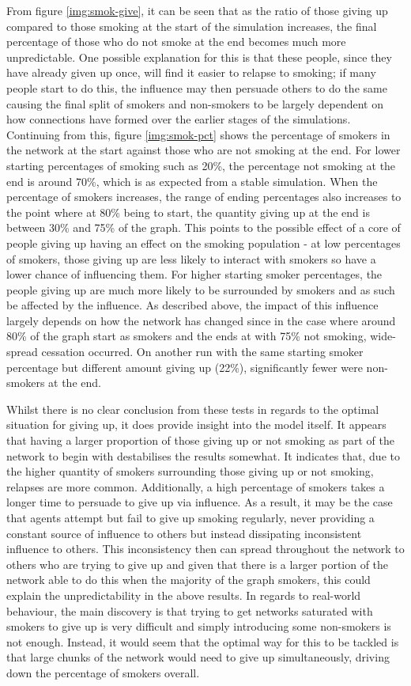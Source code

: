 \documentclass[]{report}
\begin{document}
From figure \ref{img:smok-give}, it can be seen that as the ratio of those giving up compared to those smoking at the start of the simulation increases, the final percentage of those who do not smoke at the end becomes much more unpredictable. One possible explanation for this is that these people, since they have already given up once, will find it easier to relapse to smoking; if many people start to do this, the influence may then persuade others to do the same causing the final split of smokers and non-smokers to be largely dependent on how connections have formed over the earlier stages of the simulations. Continuing from this, figure \ref{img:smok-pct} shows the percentage of smokers in the network at the start against those who are not smoking at the end. For lower starting percentages of smoking such as 20\%, the percentage not smoking at the end is around 70\%, which is as expected from a stable simulation. When the percentage of smokers increases, the range of ending percentages also increases to the point where at 80\% being to start, the quantity giving up at the end is between 30\% and 75\% of the graph. This points to the possible effect of a core of people giving up having an effect on the smoking population - at low percentages of smokers, those giving up are less likely to interact with smokers so have a lower chance of influencing them. For higher starting smoker percentages, the people giving up are much more likely to be surrounded by smokers and as such be affected by the influence. As described above, the impact of this influence largely depends on how the network has changed since in the case where around 80\% of the graph start as smokers and the ends at with 75\% not smoking, wide-spread cessation occurred. On another run with the same starting smoker percentage but different amount giving up (22\%), significantly fewer were non-smokers at the end.

Whilst there is no clear conclusion from these tests in regards to the optimal situation for giving up, it does provide insight into the model itself. It appears that having a larger proportion of those giving up or not smoking as part of the network to begin with destabilises the results somewhat. It indicates that, due to the higher quantity of smokers surrounding those giving up or not smoking, relapses are more common. Additionally, a high percentage of smokers takes a longer time to persuade to give up via influence. As a result, it may be the case that agents attempt but fail to give up smoking regularly, never providing a constant source of influence to others but instead dissipating inconsistent influence to others. This inconsistency then can spread throughout the network to others who are trying to give up and given that there is a larger portion of the network able to do this when the majority of the graph smokers, this could explain the unpredictability in the above results. In regards to real-world behaviour, the main discovery is that trying to get networks saturated with smokers to give up is very difficult and simply introducing some non-smokers is not enough. Instead, it would seem that the optimal way for this to be tackled is that large chunks of the network would need to give up simultaneously, driving down the percentage of smokers overall.
\end{document}
